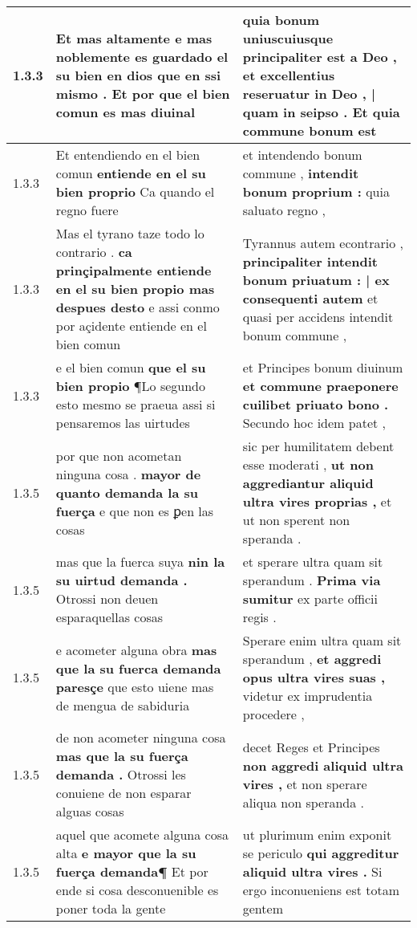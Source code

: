 \begin{tabular}{|p{1cm}|p{6.5cm}|p{6.5cm}|}
1.3.3 & Et mas altamente \textbf{ e mas noblemente es guardado el su bien en dios que en ssi mismo . } Et por que el bien comun es mas diuinal & quia bonum uniuscuiusque principaliter est a Deo , \textbf{ et excellentius reseruatur in Deo , | quam in seipso . } Et quia commune bonum est \\\hline
1.3.3 & Et entendiendo en el bien comun \textbf{ entiende en el su bien proprio } Ca quando el regno fuere & et intendendo bonum commune , \textbf{ intendit bonum proprium : } quia saluato regno , \\\hline
1.3.3 & Mas el tyrano taze todo lo contrario . \textbf{ ca prinçipalmente entiende en el su bien propio mas despues desto } e assi conmo por açidente entiende en el bien comun & Tyrannus autem econtrario , \textbf{ principaliter intendit bonum priuatum : | ex consequenti autem } et quasi per accidens intendit bonum commune , \\\hline
1.3.3 & e el bien comun \textbf{ que el su bien propio } ¶Lo segundo esto mesmo se praeua assi si pensaremos las uirtudes & et Principes bonum diuinum \textbf{ et commune praeponere cuilibet priuato bono . } Secundo hoc idem patet , \\\hline
1.3.5 & por que non acometan ninguna cosa . \textbf{ mayor de quanto demanda la su fuerça } e que non es ꝑen las cosas & sic per humilitatem debent esse moderati , \textbf{ ut non aggrediantur aliquid ultra vires proprias , } et ut non sperent non speranda . \\\hline
1.3.5 & mas que la fuerca suya \textbf{ nin la su uirtud demanda . } Otrossi non deuen esparaquellas cosas & et sperare ultra quam sit sperandum . \textbf{ Prima via sumitur } ex parte officii regis . \\\hline
1.3.5 & e acometer alguna obra \textbf{ mas que la su fuerca demanda paresçe } que esto uiene mas de mengua de sabiduria & Sperare enim ultra quam sit sperandum , \textbf{ et aggredi opus ultra vires suas , } videtur ex imprudentia procedere , \\\hline
1.3.5 & de non acometer ninguna cosa \textbf{ mas que la su fuerça demanda . } Otrossi les conuiene de non esparar alguas cosas & decet Reges et Principes \textbf{ non aggredi aliquid ultra vires , } et non sperare aliqua non speranda . \\\hline
1.3.5 & aquel que acomete alguna cosa alta \textbf{ e mayor que la su fuerça demanda¶ } Et por ende si cosa desconuenible es poner toda la gente & ut plurimum enim exponit se periculo \textbf{ qui aggreditur aliquid ultra vires . } Si ergo inconueniens est totam gentem \\\hline

\end{tabular}

